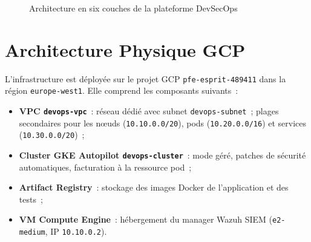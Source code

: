 \begin{figure}[H]
    \centering
    \caption{Architecture en six couches de la plateforme DevSecOps}
    \label{fig:couches}
\end{figure}


\section{Architecture Physique GCP}

L'infrastructure est déployée sur le projet GCP \texttt{pfe-esprit-489411} dans la région
\texttt{europe-west1}. Elle comprend les composants suivants~:

\begin{itemize}
  \item \textbf{VPC \texttt{devops-vpc}}~: réseau dédié avec subnet \texttt{devops-subnet}~;
        plages secondaires pour les nœuds (\texttt{10.10.0.0/20}), pods (\texttt{10.20.0.0/16})
        et services (\texttt{10.30.0.0/20})~;
  \item \textbf{Cluster GKE Autopilot \texttt{devops-cluster}}~: mode géré, patches de
        sécurité automatiques, facturation à la ressource pod~;
  \item \textbf{Artifact Registry}~: stockage des images Docker de l'application et des tests~;
  \item \textbf{VM Compute Engine}~: hébergement du manager Wazuh SIEM
        (\texttt{e2-medium}, IP \texttt{10.10.0.2}).
\end{itemize}

